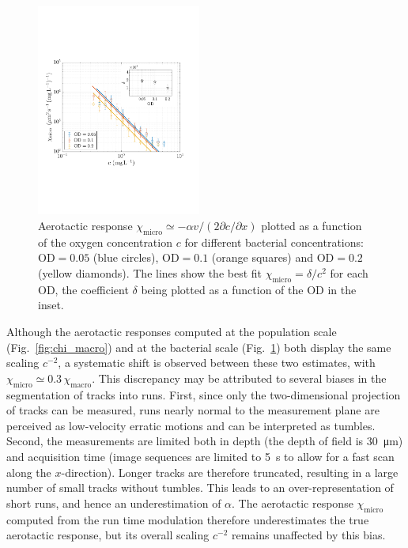 \documentclass[aps,a4paper,twocolumn,10pt,pre,showpacs]{revtex4-2}
\begin{document}
\begin{figure}[tb]
\includegraphics[trim = 8mm 63mm 19mm 70mm, clip, width=0.48\textwidth, angle=0]{Fig10.pdf}
\caption{Aerotactic response $\chi_{\mathrm{micro}} \simeq -\alpha v/(2{\partial c}/{\partial x})$ plotted as a function of the oxygen concentration $c$ for different bacterial concentrations: $\text{OD}=0.05$ (blue circles), $\text{OD}=0.1$ (orange squares) and $\text{OD}=0.2$ (yellow diamonds). The lines show the best fit $\chi_{\mathrm{micro}}=\delta/c^2$ for each OD, the coefficient $\delta$ being plotted as a function of the OD in the inset.} %
\label{fig:chi_micro}
\end{figure}

Although the aerotactic responses computed at the population scale (Fig.~\ref{fig:chi_macro}) and at the bacterial scale (Fig.~\ref{fig:chi_micro}) both display the same scaling $c^{-2}$, a systematic shift is observed between these two estimates, with $\chi_{\mathrm{micro}} \simeq 0.3 \, \chi_{\mathrm{macro}}$. This discrepancy may be attributed to several biases in the segmentation of tracks into runs. First, since only the two-dimensional projection of tracks can be measured, runs nearly normal to the measurement plane are perceived as low-velocity erratic motions and can be interpreted as tumbles. Second, the measurements are limited both in depth (the depth of field is \SI{30}{\um}) and acquisition time (image sequences are limited to \SI{5}{\s} to allow for a fast scan along the $x$-direction). Longer tracks are therefore truncated, resulting in a large number of small tracks without tumbles. This leads to an over-representation of short runs, and hence an underestimation of $\alpha$. The aerotactic response $\chi_{\mathrm{micro}}$ computed from the run time modulation therefore underestimates the true aerotactic response, but its overall scaling $c^{-2}$ remains unaffected by this bias.
\end{document}
